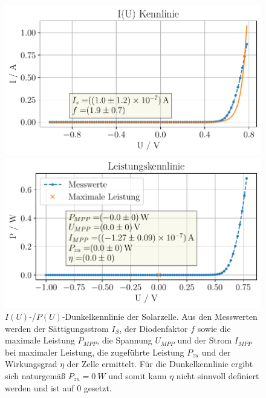 \documentclass[english, ngerman]{scrartcl}
\begin{document}
\begin{figure}[H]
    \centering
    \begin{minipage}[t]{0.485\linewidth}
        \centering
        \includegraphics[width=\linewidth]{fig/plots/dunkel_UI.pdf}
    \end{minipage}%
    \hspace*{\fill}
    \begin{minipage}[t]{0.485\linewidth}
        \centering
        \includegraphics[width=\linewidth]{fig/plots/dunkel_P.pdf}
    \end{minipage}
    \caption[$I(U)$-/$P(U)$-Dunkelkennlinie Solarzelle -- Sonnensimulator]{$I(U)$-/$P(U)$-Dunkelkennlinie der Solarzelle. Aus den Messwerten werden der Sättigungsstrom $I_S$, der Diodenfaktor $f$ sowie die maximale Leistung $P_{MPP}$, die Spannung $U_{MPP}$ und der Strom $I_{MPP}$ bei maximaler Leistung, die zugeführte Leistung $P_{zu}$ und der Wirkungsgrad $\eta$ der Zelle ermittelt. Für die Dunkelkennlinie ergibt sich naturgemäß $P_{zu} = \SI{0}{W}$ und somit kann $\eta$ nicht sinnvoll definiert werden und ist auf 0 gesetzt.}
    \label{fig:solar_dunkel}
\end{figure}
\end{document}
